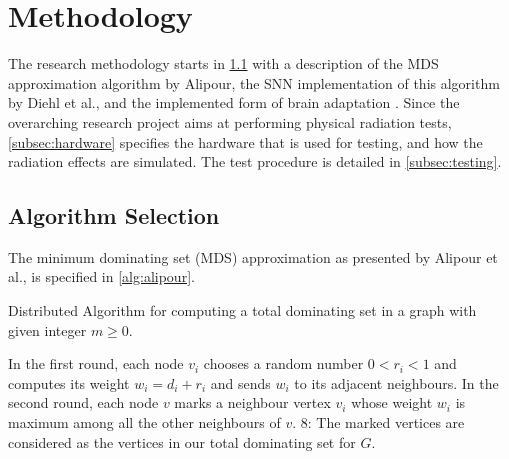 \section{Methodology}\label{sec:methodology}
The research methodology starts in \cref{subsec:algorithm} with a description of the MDS approximation algorithm by Alipour, the SNN implementation of this algorithm by Diehl et al., and the implemented form%
of brain adaptation \cite{alipour}\cite{diehl}. Since the overarching research project aims at performing physical radiation tests, \cref{subsec:hardware} specifies the hardware that is used for testing, and how the radiation effects are simulated. The test procedure is detailed in \cref{subsec:testing}.

\subsection{Algorithm Selection}\label{subsec:algorithm}
The minimum dominating set (MDS) approximation as presented by Alipour et al., is specified in \cref{alg:alipour}.
\begin{algorithm}[h]%
    \caption{Distributed Algorithm for computing a total dominating set in a graph with given integer $m\geq 0$.}\label{alg:alipour}
    In the first round, each node $v_i$ chooses a random number $0<r_i<1$ and computes its weight $w_i=d_i+r_i$ and sends $w_i$ to its
    adjacent neighbours.\;
    In the second round, each node $v$ marks a neighbour vertex $v_i$ whose weight $w_i$ is maximum among all the other neighbours of $v$.\;
    8: The marked vertices are considered as the vertices in our total dominating set for $G$.\;
\end{algorithm}

